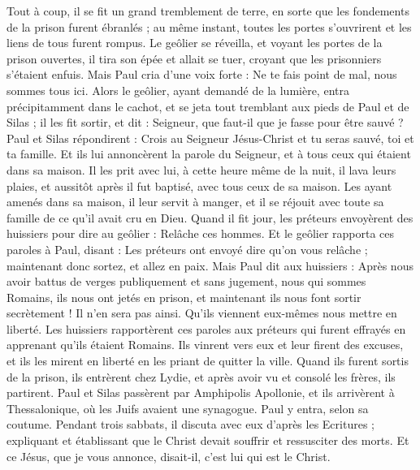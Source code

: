 \begin{multicols}{2}
Tout à coup, il se fit un grand tremblement de terre, en sorte que les fondements de la prison furent ébranlés ; au même instant, toutes les portes s'ouvrirent et les liens de tous furent rompus.
Le geôlier se réveilla, et voyant les portes de la prison ouvertes, il tira son épée et allait se tuer, croyant que les prisonniers s’étaient enfuis.
Mais Paul cria d’une voix forte : Ne te fais point de mal, nous sommes tous ici.
Alors le geôlier, ayant demandé de la lumière, entra précipitamment dans le cachot, et se jeta tout tremblant aux pieds de Paul et de Silas ;
il les fit sortir, et dit : Seigneur, que faut-il que je fasse pour être sauvé ?
Paul et Silas répondirent : Crois au Seigneur Jésus-Christ et tu seras sauvé, toi et ta famille.
Et ils lui annoncèrent la parole du Seigneur, et à tous ceux qui étaient dans sa maison.
Il les prit avec lui, à cette heure même de la nuit, il lava leurs plaies, et aussitôt après il fut baptisé, avec tous ceux de sa maison.
Les ayant amenés dans sa maison, il leur servit à manger, et il se réjouit avec toute sa famille de ce qu’il avait cru en Dieu.
Quand il fit jour, les préteurs envoyèrent des huissiers pour dire au geôlier : Relâche ces hommes.
Et le geôlier rapporta ces paroles à Paul, disant : Les préteurs ont envoyé dire qu'on vous relâche ; maintenant donc sortez, et allez en paix.
Mais Paul dit aux huissiers : Après nous avoir battus de verges publiquement et sans jugement, nous qui sommes Romains, ils nous ont jetés en prison, et maintenant ils nous font sortir secrètement ! Il n'en sera pas ainsi. Qu’ils viennent eux-mêmes nous mettre en liberté.
Les huissiers rapportèrent ces paroles aux préteurs qui furent effrayés en apprenant qu'ils étaient Romains.
Ils vinrent vers eux et leur firent des excuses, et ils les mirent en liberté en les priant de quitter la ville.
Quand ils furent sortis de la prison, ils entrèrent chez Lydie, et après avoir vu et consolé les frères, ils partirent.
\VerseOne{}Paul et Silas passèrent par Amphipolis Apollonie, et ils arrivèrent à Thessalonique, où les Juifs avaient une synagogue.
Paul y entra, selon sa coutume. Pendant trois sabbats, il discuta avec eux d’après les Ecritures ;
expliquant et établissant que le Christ devait souffrir et ressusciter des morts. Et ce Jésus, que je vous annonce, disait-il, c’est lui qui est le Christ.

\end{multicols}

